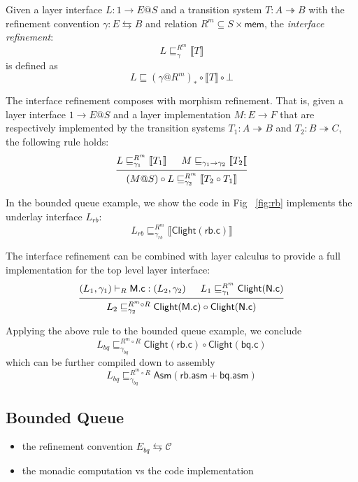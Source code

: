 \documentclass[sigplan,10pt,review,anonymous]{acmart}
\newcommand{\kw}[1]{\ensuremath{ \mathsf{#1} }}
\begin{document}
Given a layer interface $L: 1 \rightarrow E@S$ and a transition system
$T: A \twoheadrightarrow B$ with the refinement convention
$\gamma: E \leftrightarrows B$ and relation $R^m \subseteq S \times \kw{mem}$,
the \emph{interface refinement}:
\[
  L \sqsubseteq_{\gamma}^{R^m} \llbracket T \rrbracket
\]
is defined as
\[
  L \sqsubseteq (\gamma @ R^m)_* \circ \llbracket T \rrbracket \circ \bot
\]

The interface refinement composes with morphism refinement. That is, given a
layer interface $1 \rightarrow E@S$ and a layer implementation
$M: E \rightarrow F$ that are respectively implemented by the transition systems
$T_1: A \twoheadrightarrow B$ and $T_2: B \twoheadrightarrow C$, the following
rule holds:
\[
  \begin{prooftree}
    \hypo{L \sqsubseteq_{\gamma_1}^{R^m} \llbracket T_1 \rrbracket}
    \hypo{M \sqsubseteq_{\gamma_1 \rightarrow \gamma_2} \llbracket T_2 \llbracket}
    \infer2{ (M @ S) \circ L \sqsubseteq_{\gamma_2}^{R^m} \llbracket T_2 \circ T_1 \rrbracket}
  \end{prooftree}
\]

In the bounded queue example, we show the code in Fig ~\ref{fig:rb} implements the
underlay interface $L_{rb}$:
\[
  L_{rb} \sqsubseteq_{\gamma_{rb}}^{R^m} \llbracket \kw{Clight}(\kw{rb.c}) \rrbracket
\]

The interface refinement can be combined with layer calculus to provide a full
implementation for the top level layer interface:
\[
  \begin{prooftree}
    \hypo{(L_1, \gamma_1) \vdash_R \kw{M.c} : (L_2, \gamma_2)}
    \hypo{ L_1 \sqsubseteq_{\gamma_1}^{R^m} \kw{Clight}(\kw{N.c}) }
    \infer2{ L_2 \sqsubseteq_{\gamma_2}^{R^m \circ R} \kw{Clight}(\kw{M.c}) \circ \kw{Clight}(\kw{N.c}) }
  \end{prooftree}
\]


Applying the above rule to the bounded queue example, we conclude
\[
  L_{bq} \sqsubseteq_{\gamma_{bq}}^{R^m \circ R} \kw{Clight}(\kw{rb.c}) \circ \kw{Clight}(\kw{bq.c})
\]
which can be further compiled down to assembly
\[
  L_{bq} \sqsubseteq_{\gamma_{bq}}^{R^m \circ R} \kw{Asm}(\kw{rb.asm} + \kw{bq.asm})
\]


\subsection{Bounded Queue}

\begin{itemize}
  \item the refinement convention $E_{bq} \leftrightarrows \mathcal{C}$
  \item the monadic computation vs the code implementation
\end{itemize}
\end{document}
